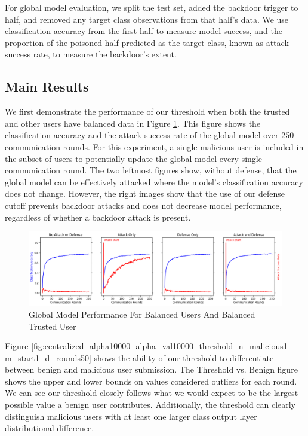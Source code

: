 \documentclass{article} %
\begin{document}
For global model evaluation, we split the test set, added the backdoor trigger to half, and removed any target class observations from that half's data. We use classification accuracy from the first half to measure model success, and the proportion of the poisoned half predicted as the target class, known as attack success rate, to measure the backdoor's extent.


%
\subsection{Main Results}
We first demonstrate the performance of our threshold when both the trusted and other users have balanced data in Figure \ref{fig:centralized--alpha10000--alpha_val10000--accuracy--n_malicious1--m_start1}. This figure shows the classification accuracy and the attack success rate of the global model over 250 communication rounds. For this experiment, a single malicious user is included in the subset of users to potentially update the global model every single communication round. The two leftmost figures show, without defense, that the global model can be effectively attacked where the model's classification accuracy does not change. However, the right images show that the use of our defense cutoff prevents backdoor attacks and does not decrease model performance, regardless of whether a backdoor attack is present. 

\begin{figure}[H]
    \centering
    \includegraphics[width=\textwidth]{centralized/alpha10000--alpha_val10000/visuals/accuracy--n_malicious1--m_start1.png}
    \caption{Global Model Performance For Balanced Users And Balanced Trusted User}
    \label{fig:centralized--alpha10000--alpha_val10000--accuracy--n_malicious1--m_start1}
\end{figure}

Figure \ref{fig:centralized--alpha10000--alpha_val10000--threshold--n_malicious1--m_start1--d_rounds50} shows the ability of our threshold to differentiate between benign and malicious user submission. The Threshold vs. Benign figure shows the upper and lower bounds on values considered outliers for each round. We can see our threshold closely follows what we would expect to be the largest possible value a benign user contributes. Additionally, the threshold can clearly distinguish malicious users with at least one larger class output layer distributional difference. 
\end{document}
